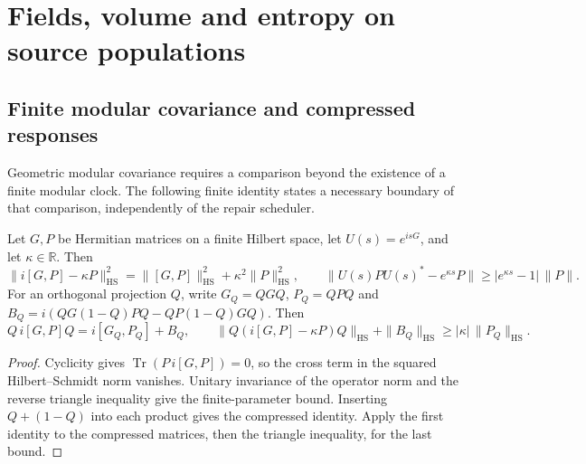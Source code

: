 \documentclass[11pt]{article}
\begin{document}






\section{Fields, volume and entropy on source populations}
\label{app:source-fields-entropy}







\subsection{Finite modular covariance and compressed responses}
\label{sec:finite-modular-covariance}

Geometric modular covariance requires a comparison beyond the existence
of a finite modular clock. The following finite identity states a necessary
boundary of that comparison, independently of the repair scheduler.

\begin{proposition}
\label{prop:finite-modular-dilation}
Let $G,P$ be Hermitian matrices on a finite Hilbert space, let
$U(s)=e^{isG}$, and let $\kappa\in\mathbb R$. Then
\[
 \|i[G,P]-\kappa P\|_{\mathrm{HS}}^2
 =\|[G,P]\|_{\mathrm{HS}}^2+\kappa^2\|P\|_{\mathrm{HS}}^2,
 \qquad
 \|U(s)PU(s)^*-e^{\kappa s}P\|
 \geq |e^{\kappa s}-1|\,\|P\|.
\]
For an orthogonal projection $Q$, write $G_Q=QGQ$, $P_Q=QPQ$ and
$B_Q=i(QG(1-Q)PQ-QP(1-Q)GQ)$. Then
\[
 Q\,i[G,P]Q=i[G_Q,P_Q]+B_Q,
 \qquad
 \|Q(i[G,P]-\kappa P)Q\|_{\mathrm{HS}}+\|B_Q\|_{\mathrm{HS}}
 \geq |\kappa|\,\|P_Q\|_{\mathrm{HS}}.
\]
\end{proposition}
\begin{proof}
Cyclicity gives $\operatorname{Tr}(P\,i[G,P])=0$, so the cross term
in the squared Hilbert--Schmidt norm vanishes. Unitary invariance of
the operator norm and the reverse triangle inequality give the
finite-parameter bound. Inserting $Q+(1-Q)$ into each product gives
the compressed identity. Apply the first identity to the compressed
matrices, then the triangle inequality, for the last bound.
\end{proof}
\end{document}
